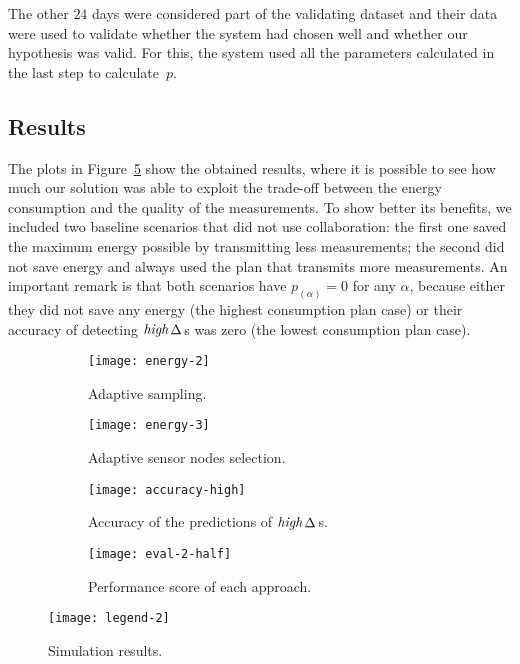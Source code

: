 \documentclass{llncs}
\newcommand{\ourDelta}[2][]{\ensuremath{\Delta\textsuperscript{\text{#1}}
\textsubscript{\text{#2}}}}
\newcommand{\high}[1][ ]{\ensuremath{\text{\emph{high}}#1}}
\newcommand{\highDelta}[2][]{\high{\ourDelta[#1]{#2}}}
\begin{document}
The other $24$ days were considered part of the validating dataset and their 
data were used to validate whether the system had chosen well and whether our 
hypothesis was valid. For this, the system used all the parameters 
calculated in the last step to calculate~$p$.






\subsection{Results}



The plots in Figure~\ref{fig:results} show the obtained results, where it is 
possible to see how much our solution was able to exploit the trade-off between 
the energy consumption and the quality of the measurements. To show better its 
benefits, we included two baseline scenarios that did not use collaboration: the 
first one saved the maximum energy possible by transmitting less measurements; 
the second did not save energy and always used the plan that transmits more 
measurements. An important remark is that both scenarios have $p_{(\alpha)} = 0$ 
for any $\alpha$, because either they did not save any energy (the highest 
consumption plan case) or their accuracy of detecting \highDelta{}s was zero 
(the lowest consumption plan case).

\begin{figure}[h]
	\centering
\begin{subfigure}[t]{0.4\textwidth}
		\centering
		
\texttt{[image: energy-2]}
		\caption{Adaptive sampling.}
		\label{fig:results-energy-2}
	\end{subfigure}\qquad
	\begin{subfigure}[t]{0.4\textwidth}
		\centering
		
\texttt{[image: energy-3]}
		\caption{Adaptive sensor nodes selection.}
		\label{fig:results-energy-3}
	\end{subfigure}\qquad
	\begin{subfigure}[t]{0.4\textwidth}
		\centering
		
\texttt{[image: accuracy-high]}
		\caption{Accuracy of the predictions of \highDelta{}s.}
		\label{fig:results-accuracy_high}
	\end{subfigure}\qquad
	\begin{subfigure}[t]{0.4\textwidth}
		\centering
		
\texttt{[image: eval-2-half]}
		\caption{Performance score of each approach.}
		\label{fig:results-eval}
	\end{subfigure}

	\centering
	\texttt{[image: legend-2]}
	\label{fig:results-legend}
	
	\caption{Simulation results.}
	\label{fig:results}
	
\end{figure}
\end{document}
